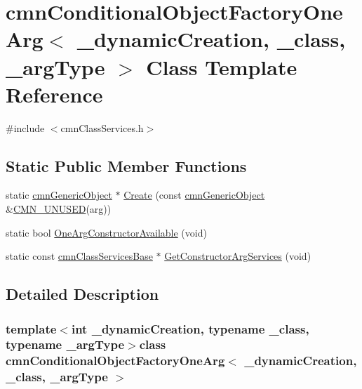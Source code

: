 \hypertarget{classcmn_conditional_object_factory_one_arg}{\section{cmn\-Conditional\-Object\-Factory\-One\-Arg$<$ \-\_\-dynamic\-Creation, \-\_\-class, \-\_\-arg\-Type $>$ Class Template Reference}
\label{classcmn_conditional_object_factory_one_arg}
}


{\ttfamily \#include $<$cmn\-Class\-Services.\-h$>$}

\subsection*{Static Public Member Functions}
\begin{DoxyCompactItemize}
\item 
static \hyperlink{classcmn_generic_object}{cmn\-Generic\-Object} $\ast$ \hyperlink{classcmn_conditional_object_factory_one_arg_a3a5d1e07df67f33f80f47328ae3b956b}{Create} (const \hyperlink{classcmn_generic_object}{cmn\-Generic\-Object} \&\hyperlink{cmn_portability_8h_a021894e2626935fa2305434b1e893ff6}{C\-M\-N\-\_\-\-U\-N\-U\-S\-E\-D}(arg))
\item 
static bool \hyperlink{classcmn_conditional_object_factory_one_arg_a19c7018c0c501a3efb544ffea93944f5}{One\-Arg\-Constructor\-Available} (void)
\item 
static const \hyperlink{classcmn_class_services_base}{cmn\-Class\-Services\-Base} $\ast$ \hyperlink{classcmn_conditional_object_factory_one_arg_acd821221491f8271382e818f6d98dba5}{Get\-Constructor\-Arg\-Services} (void)
\end{DoxyCompactItemize}


\subsection{Detailed Description}
\subsubsection*{template$<$int \-\_\-dynamic\-Creation, typename \-\_\-class, typename \-\_\-arg\-Type$>$class cmn\-Conditional\-Object\-Factory\-One\-Arg$<$ \-\_\-dynamic\-Creation, \-\_\-class, \-\_\-arg\-Type $>$}

